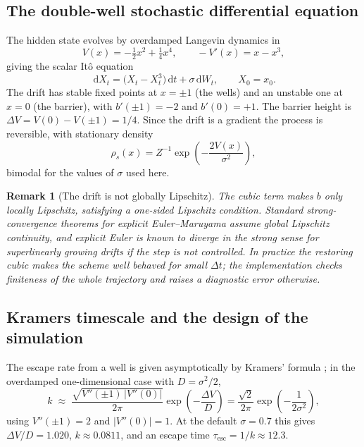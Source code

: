 \documentclass[11pt]{article}
\newtheorem{remark}{Remark}
\newcommand{\dd}{\,\mathrm{d}}
\begin{document}
\subsection{The double-well stochastic differential equation}

The hidden state evolves by overdamped Langevin dynamics in
\begin{equation}
V(x) = -\tfrac12 x^2 + \tfrac14 x^4 ,
\qquad -V'(x) = x - x^3 ,
\label{eq:potential}
\end{equation}
giving the scalar It\^o equation
\begin{equation}
\dd X_t = \bigl(X_t - X_t^3\bigr)\dd t + \sigma\dd W_t , \qquad X_0 = x_0 .
\label{eq:sde}
\end{equation}
The drift has stable fixed points at $x = \pm1$ (the wells) and an unstable one
at $x = 0$ (the barrier), with $b'(\pm1) = -2$ and $b'(0) = +1$. The barrier
height is $\Delta V = V(0) - V(\pm1) = 1/4$. Since the drift is a gradient the
process is reversible, with stationary density
\begin{equation}
\rho_s(x) = Z^{-1}\exp\!\left(-\frac{2V(x)}{\sigma^2}\right) ,
\label{eq:stationary}
\end{equation}
bimodal for the values of $\sigma$ used here.

\begin{remark}[The drift is not globally Lipschitz]
The cubic term makes $b$ only locally Lipschitz, satisfying a one-sided Lipschitz
condition. Standard strong-convergence theorems for explicit Euler--Maruyama
assume global Lipschitz continuity, and explicit Euler is known to diverge in the
strong sense for superlinearly growing drifts if the step is not controlled. In
practice the restoring cubic makes the scheme well behaved for small $\Delta t$;
the implementation checks finiteness of the whole trajectory and raises a
diagnostic error otherwise.
\end{remark}

\subsection{Kramers timescale and the design of the simulation}
\label{sec:kramers}

The escape rate from a well is given asymptotically by Kramers' formula
\citep{kramers1940brownian}; in the overdamped one-dimensional case with
$D = \sigma^2/2$,
\begin{equation}
k \;\approx\; \frac{\sqrt{V''(\pm 1)\,\lvert V''(0)\rvert}}{2\pi}
\exp\!\left(-\frac{\Delta V}{D}\right)
= \frac{\sqrt2}{2\pi}\exp\!\left(-\frac{1}{2\sigma^2}\right) ,
\label{eq:kramers}
\end{equation}
using $V''(\pm1) = 2$ and $\lvert V''(0)\rvert = 1$. At the default
$\sigma = 0.7$ this gives $\Delta V/D = 1.020$, $k \approx 0.0811$, and an escape
time $\tau_{\mathrm{esc}} = 1/k \approx 12.3$.
\end{document}
